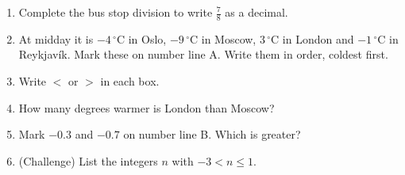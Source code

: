\documentclass{beamer}
\newcommand{\ashow}[1]{\uncover<2->{\textcolor{red}{\small #1}}}
\newcommand{\abox}[1]{%
  \tikz[baseline=(b.base)]\node[draw=gray, densely dotted, inner sep=1.5pt] (b)
    {\alt<2->{\textcolor{red}{#1}}{\phantom{#1}}};%
}
\newcommand{\tightlist}{%
  \setlength{\itemsep}{0pt}\setlength{\parskip}{0pt}\setlength{\topsep}{0pt}%
}
\newcommand{\dC}[1]{$#1\,^{\circ}$C}
\begin{document}
\begin{frame}
\begin{columns}[T,onlytextwidth]
\begin{tikzpicture}[every node/.style={font=\scriptsize}]
\end{tikzpicture}

\vspace{-1.5em}
\footnotesize
\begin{enumerate}\tightlist
{}
  \item Complete the bus stop division to write $\frac78$ as a decimal.
        \ashow{$0.875$}
  \item At midday it is \dC{-4} in Oslo, \dC{-9} in Moscow, \dC{3} in London and
        \dC{-1} in Reykjavík. Mark these on number line A. Write them in order,
        coldest first.
        \ashow{$-9$, \; $-4$, \; $-1$, \; $3$}
  \item[] Write $<$ or $>$ in each box.
{\setlength{\columnsep}{14pt}%
}
  \item How many degrees warmer is London than Moscow?
        \ashow{$12$ degrees}
  \item Mark $-0.3$ and $-0.7$ on number line B. Which is greater?
        \ashow{$-0.3$, because it is further right}
  \item (Challenge) List the integers $n$ with $-3<n\leq1$.
        \ashow{$-2,\ -1,\ 0,\ 1$}
\end{enumerate}
\end{columns}
\end{frame}
\end{document}
